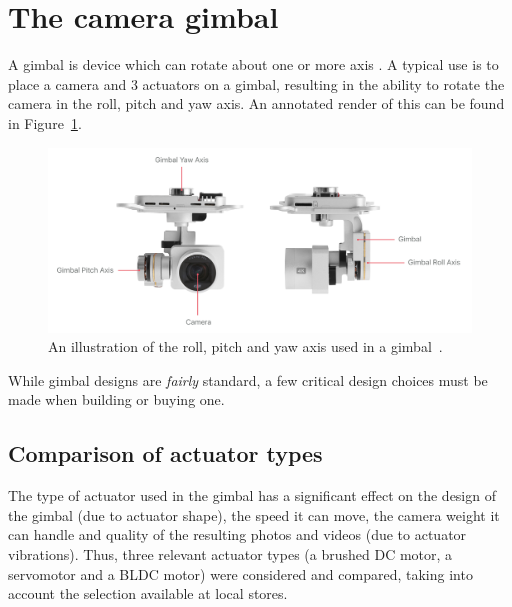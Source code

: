 \section{The camera gimbal}
A gimbal is device which can rotate about one or more axis \cite{website:definition_gimbal}. A typical use is to place a camera and 3 actuators on a gimbal, resulting in the ability to rotate the camera in the roll, pitch and yaw axis. An annotated render of this can be found in Figure~\ref{fig:roll_pitch_yaw_camera}.

\begin{figure}[h!]
  \centering
  \includegraphics[width=\textwidth]{literature_review/roll_pitch_yaw_gimbal.png}
  \caption{\label{fig:roll_pitch_yaw_camera} An illustration of the roll, pitch and yaw axis used in a gimbal~\cite{roll_pitch_yaw_camera}.}
\end{figure}

While gimbal designs are \emph{fairly} standard, a few critical design choices must be made when building or buying one.%

\subsection{Comparison of actuator types}
The type of actuator used in the gimbal has a significant effect on the design of the gimbal (due to actuator shape), the speed it can move, the camera weight it can handle and quality of the resulting photos and videos (due to actuator vibrations). Thus, three relevant actuator types (a brushed DC motor, a servomotor and a BLDC motor) were considered and compared, taking into account the selection available at local stores.

